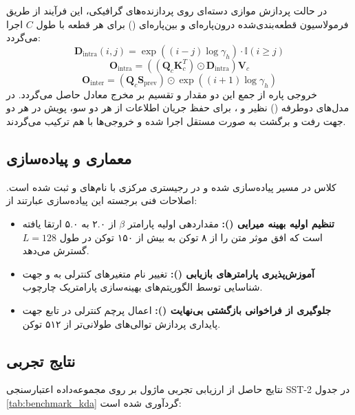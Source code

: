 در حالت پردازش موازی دسته‌ای روی پردازنده‌های گرافیکی، این فرآیند از طریق فرمولاسیون قطعه‌بندی‌شده درون‌پاره‌ای و بین‌پاره‌ای () برای هر قطعه با طول $C$ اجرا می‌گردد:
\begin{equation}
\mathbf{D}_{\text{intra}}(i, j) = \exp\left((i - j) \log \gamma_h\right) \cdot \mathbb{I}(i \ge j)
\end{equation}
\begin{equation}
\mathbf{O}_{\text{intra}} = \left( (\mathbf{Q}_c \mathbf{K}_c^T) \odot \mathbf{D}_{\text{intra}} \right) \mathbf{V}_c
\end{equation}
\begin{equation}
\mathbf{O}_{\text{inter}} = (\mathbf{Q}_c \mathbf{S}_{\text{prev}}) \odot \exp\left((i + 1) \log \gamma_h\right)
\end{equation}
خروجی پاره از جمع این دو مقدار و تقسیم بر مخرج معادل حاصل می‌گردد. در مدل‌های دوطرفه () نظیر  و ، برای حفظ جریان اطلاعات از هر دو سو، پویش در هر دو جهت رفت و برگشت به صورت مستقل اجرا شده و خروجی‌ها با هم ترکیب می‌گردند.

\subsection{معماری و پیاده‌سازی}
کلاس  در مسیر  پیاده‌سازی شده و در رجیستری مرکزی با نام‌های  و  ثبت شده است. اصلاحات فنی برجسته این پیاده‌سازی عبارتند از:
\begin{itemize}
    \item \textbf{تنظیم اولیه بهینه میرایی ():} مقداردهی اولیه پارامتر $\beta$ از ۲.۰ به ۵.۰ ارتقا یافته است که افق موثر متن را از ۸ توکن به بیش از ۱۵۰ توکن در طول $L=128$ گسترش می‌دهد.
    \item \textbf{آموزش‌پذیری پارامترهای بازیابی ():} تغییر نام متغیرهای کنترلی به  و  جهت شناسایی توسط الگوریتم‌های بهینه‌سازی پارامتریک چارچوب.
    \item \textbf{جلوگیری از فراخوانی بازگشتی بی‌نهایت ():} اعمال پرچم کنترلی  در تابع  جهت پایداری پردازش توالی‌های طولانی‌تر از ۵۱۲ توکن.
\end{itemize}

\subsection{نتایج تجربی}
نتایج حاصل از ارزیابی تجربی ماژول  بر روی مجموعه‌داده اعتبارسنجی SST-2 در جدول \ref{tab:benchmark_kda} گردآوری شده است:

